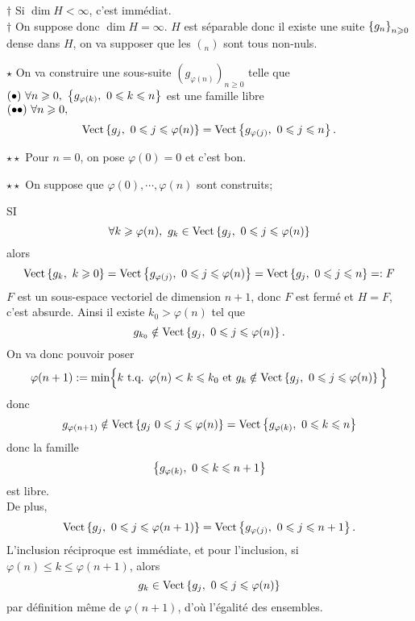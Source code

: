 \documentclass[a4paper,11pt, twoside]{article}
\begin{document}
\begin{Proof}
  $\dagger$ Si $\dim H<\infty$, c'est immédiat.\\

  $\dagger$ On suppose donc $\dim H=\infty$. $H$ est séparable donc il existe une suite $\left\{g_n\right\}_{n\geqslant 0}$ dense dans $H$, on va supposer que les $(_n)$ sont tous non-nuls. 

  $\star$ On va construire une sous-suite $(g_{\varphi(n)})_{n\geqslant 0}$ telle que\\
  $\Bullet\ \forall n\geqslant 0,\ \ens{g_{\varphi(k)},\ 0\leqslant k\leqslant n}$ est une famille libre\\
  $(\bullet\bullet)\ \forall n\geqslant 0,$
  $$\mathrm{Vect}\left\{g_j,\ 0\leqslant j\leqslant \varphi(n)\right\}=\mathrm{Vect}\left\{g_{\varphi(j)},\ 0\leqslant j\leqslant n\right\}.$$

  $\star\star$ Pour $n=0$, on pose $\varphi(0)=0$ et c'est bon.

  $\star\star$ On suppose que $\varphi(0),\cdots,\varphi(n)$ sont construits;

  SI 
  $$\forall k\geqslant \varphi(n),\ g_k\in \mathrm{Vect}\ens{g_j,\ 0\leqslant j\leqslant \varphi(n)}$$ 
  alors
  $$\mathrm{Vect}\left\{g_k,\ k\geqslant 0\right\}=\mathrm{Vect}\left\{g_{\varphi(j)},\ 0\leqslant j\leqslant \varphi(n)\right\}=\mathrm{Vect}\left\{g_j,\ 0\leqslant j\leqslant n\right\}=:F$$
  $F$ est un sous-espace vectoriel de dimension $n+1$, donc $F$ est fermé et $H=F$, c'est absurde. Ainsi il existe $k_0>\varphi(n)$ tel que 
  $$g_{k_0}\notin \mathrm{Vect}\left\{g_j,\ 0\leqslant j\leqslant \varphi(n)\right\}.$$
  On va donc pouvoir poser 
  $$\varphi(n+1):=\mathrm{min}\Big\{k\text{ t.q. }\varphi(n)<k\leqslant k_0\text{ et }g_{k}\notin \mathrm{Vect}\left\{g_j,\ 0\leqslant j\leqslant \varphi(n)\right\}\Big\}$$
  donc
  $$g_{\varphi(n+1)}\notin \mathrm{Vect}\ens{g_j\ 0\leqslant j\leqslant \varphi(n)}=\mathrm{Vect}\ens{g_{\varphi(k)},\ 0\leqslant k\leqslant n}$$
  donc la famille 
  $$\left\{g_{\varphi(k)},\ 0\leqslant k\leqslant n+1\right\}$$
  est libre.\\

  De plus, 
  $$\mathrm{Vect}\left\{g_j,\ 0\leqslant j\leqslant \varphi(n+1)\right\}=\mathrm{Vect}\left\{g_{\varphi(j)},\ 0\leqslant j\leqslant n+1\right\}.$$
  L'inclusion réciproque est immédiate, et pour l'inclusion, si $\varphi(n)\leqslant k\leqslant \varphi(n+1)$, alors 
  $$g_k\in\mathrm{Vect}\ens{g_j,\ 0\leqslant j\leqslant \varphi(n)}$$
  par définition même de $\varphi(n+1)$, d'où l'égalité des ensembles.\\


\end{Proof}
\end{document}
